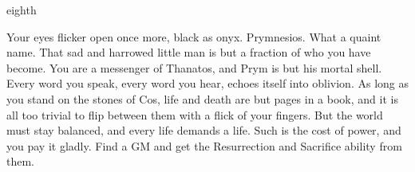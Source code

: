 \documentclass[greennotebook]{Kos}
\begin{document}
\begin{page}{eighth}

Your eyes flicker open once more, black as onyx. Prymnesios. What a quaint name. That sad and harrowed little man is but a fraction of who you have become. You are a messenger of Thanatos, and Prym is but his mortal shell. Every word you speak, every word you hear, echoes itself into oblivion. As long as you stand on the stones of Cos, life and death are but pages in a book, and it is all too trivial to flip between them with a flick of your fingers. But the world must stay balanced, and every life demands a life. Such is the cost of power, and you pay it gladly. Find a GM and get the Resurrection and Sacrifice ability from them. 

\end{page}

\endnotebook
\end{document}
